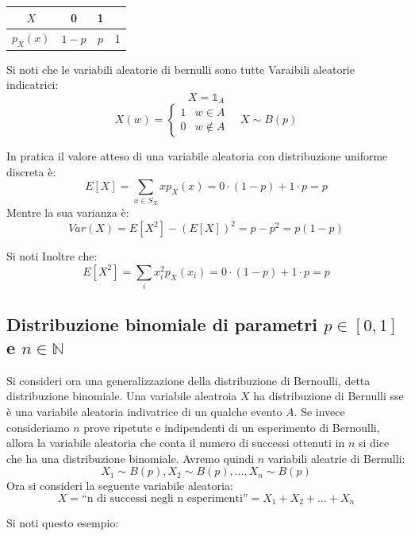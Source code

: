 \begin{center}
  \begin{tabular}{c|c|c|c}
    $X$ & 0 & 1& \\
    \hline
    $p_X(x)$ & $1-p$ & $p$ & 1\\ 
  \end{tabular}
\end{center}

Si noti che le variabili aleatorie di bernulli sono tutte Varaibili aleatorie indicatrici:
\[
  X = \mathbb{1}_A
\]
\[
  X(w) = \begin{cases}
    1 & w\in A\\
    0 & w\notin A
  \end{cases} \quad X \sim B(p)
\]

In pratica il valore atteso di una variabile aleatoria con distribuzione uniforme discreta è:
\[
  E[X] = \sum_{x \in S_X} x p_X(x) = 0 \cdot (1-p) + 1 \cdot p = p
\]
Mentre la sua varianza è:
\[
  Var(X) = E[X^2] - (E[X])^2 = p - p^2 = p(1-p)
\]

Si noti Inoltre che:
\[
  E[X^2] = \sum_i x_i^2 p_X (x_i) = 0 \cdot (1-p) + 1 \cdot p = p
\]

\subsection{Distribuzione binomiale di parametri $ p \in [0,1] $ e $ n \in \mathbb{N} $}
Si consideri ora una generalizzazione della distribuzione di Bernoulli, detta distribuzione binomiale. Una variabile aleatroia $X$ ha distribuzione di Bernulli sse è una variabile aleatoria indivatrice di un qualche evento $A$. Se invece consideriamo $n$ prove ripetute e indipendenti di un esperimento di Bernoulli, allora la variabile aleatoria che conta il numero di successi ottenuti in $n$ si dice che ha una distribuzione binomiale. Avremo quindi $n$ variabili aleatrie  di Bernulli:
\[
  X_1 \sim B(p), X_2\sim B(p),\dots, X_n \sim B(p)
\]
Ora si consideri la seguente variabile aleatoria:
\[
  X =\text{“n di successi negli n esperimenti”} =X_1 + X_2 + \dots + X_n
\]

Si noti questo esempio:

